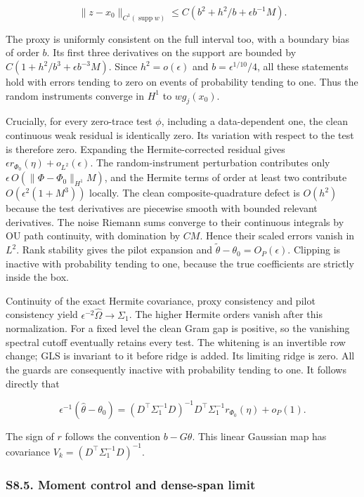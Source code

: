 \documentclass[
  american,
  11pt,
]{article}
\begin{document}
\[
\|z-x_0\|_{C^1(\operatorname{supp}w)}
\leq C(b^2+h^2/b+\epsilon b^{-1}M).
\]

The proxy is uniformly consistent on the full interval too, with a
boundary bias of order \(b\). Its first three derivatives on the support
are bounded by \(C(1+h^2/b^3+\epsilon b^{-3}M)\). Since
\(h^2=o(\epsilon)\) and \(b=\epsilon^{1/10}/4\), all these statements
hold with errors tending to zero on events of probability tending to
one. Thus the random instruments converge in \(H^1\) to \(w g_j(x_0)\).

Crucially, for every zero-trace test \(\phi\), including a
data-dependent one, the clean continuous weak residual is identically
zero. Its variation with respect to the test is therefore zero.
Expanding the Hermite-corrected residual gives
\(\epsilon r_{\Phi_0}(\eta)+o_{L^2}(\epsilon)\). The random-instrument
perturbation contributes only \(\epsilon\,O(\|\Phi-\Phi_0\|_{H^1}M)\),
and the Hermite terms of order at least two contribute
\(O(\epsilon^2(1+M^3))\) locally. The clean composite-quadrature defect
is \(O(h^2)\) because the test derivatives are piecewise smooth with
bounded relevant derivatives. The noise Riemann sums converge to their
continuous integrals by OU path continuity, with domination by \(C M\).
Hence their scaled errors vanish in \(L^2\). Rank stability gives the
pilot expansion and \(\widetilde\theta-\theta_0=O_P(\epsilon)\).
Clipping is inactive with probability tending to one, because the true
coefficients are strictly inside the box.

Continuity of the exact Hermite covariance, proxy consistency and pilot
consistency yield \(\epsilon^{-2}\widehat\Omega\to\Sigma_1\). The higher
Hermite orders vanish after this normalization. For a fixed level the
clean Gram gap is positive, so the vanishing spectral cutoff eventually
retains every test. The whitening is an invertible row change; GLS is
invariant to it before ridge is added. Its limiting ridge is zero. All
the guards are consequently inactive with probability tending to one. It
follows directly that

\[
\epsilon^{-1}(\widehat\theta-\theta_0)
= (D^\top\Sigma_1^{-1}D)^{-1}D^\top\Sigma_1^{-1}
r_{\Phi_0}(\eta)+o_P(1).
\]

The sign of \(r\) follows the convention \(b-G\theta\). This linear
Gaussian map has covariance \(V_k=(D^\top\Sigma_1^{-1}D)^{-1}\).

\subsubsection{S8.5. Moment control and dense-span
limit}\label{s8.5.-moment-control-and-dense-span-limit}
\end{document}
